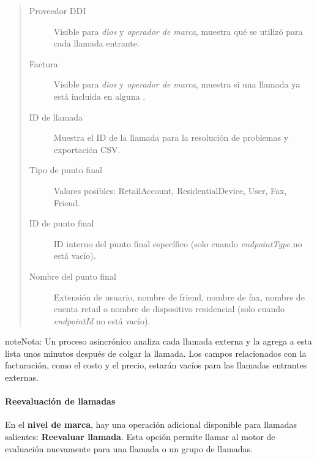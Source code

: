 \documentclass[letterpaper,10pt,spanish]{sphinxmanual}
\begin{document}
\begin{quote}
\begin{description}
\item[{Proveedor DDI}] \leavevmode
Visible para \emph{dios} y \emph{operador de marca}, muestra qué {\hyperref[administration_portal/brand/providers/ddi_providers:ddi\string-providers]{}} se utilizó para cada llamada entrante.

\item[{Factura}] \leavevmode
Visible para \emph{dios} y \emph{operador de marca}, muestra si una llamada ya está incluida en alguna {\hyperref[administration_portal/brand/invoicing/invoices:invoices]{}}.

\item[{ID de llamada}] \leavevmode
Muestra el ID de la llamada para la resolución de problemas y exportación CSV.

\item[{Tipo de punto final}] \leavevmode
Valores posibles: RetailAccount, ResidentialDevice, User, Fax, Friend.

\item[{ID de punto final}] \leavevmode
ID interno del punto final específico (solo cuando \emph{endpointType} no está vacío).

\item[{Nombre del punto final}] \leavevmode
Extensión de usuario, nombre de friend, nombre de fax, nombre de cuenta retail o nombre de dispositivo residencial (solo cuando \emph{endpointId} no está vacío).

\end{description}
\end{quote}

\begin{notice}{note}{Nota:}
Un proceso asincrónico analiza cada llamada externa y la agrega a esta lista unos minutos después de colgar la llamada. Los campos relacionados con la facturación, como el costo y el precio, estarán vacíos para las llamadas entrantes externas.
\end{notice}


\paragraph{Reevaluación de llamadas}
\label{administration_portal/client/vpbx/calls/external_calls:call-rerating}
En el \textbf{nivel de marca}, hay una operación adicional disponible para llamadas salientes: \textbf{Reevaluar llamada}. Esta opción permite llamar al motor de evaluación nuevamente para una llamada o un grupo de llamadas.
\end{document}
